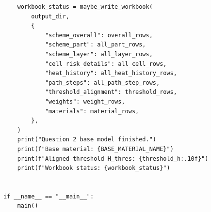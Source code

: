 \documentclass[a4paper, 12pt]{ctexart}
\begin{document}
\begin{verbatim}
    workbook_status = maybe_write_workbook(
        output_dir,
        {
            "scheme_overall": overall_rows,
            "scheme_part": all_part_rows,
            "scheme_layer": all_layer_rows,
            "cell_risk_details": all_cell_rows,
            "heat_history": all_heat_history_rows,
            "path_steps": all_path_step_rows,
            "threshold_alignment": threshold_rows,
            "weights": weight_rows,
            "materials": material_rows,
        },
    )
    print("Question 2 base model finished.")
    print(f"Base material: {BASE_MATERIAL_NAME}")
    print(f"Aligned threshold H_thres: {threshold_h:.10f}")
    print(f"Workbook status: {workbook_status}")


if __name__ == "__main__":
    main()



\end{verbatim}
\end{document}
